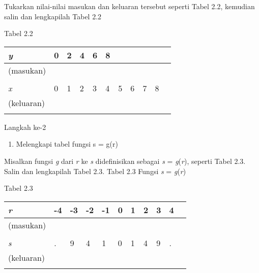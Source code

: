 \documentclass[11pt,fleqn]{book} %
\begin{document}
\begin{myEnumerate}
\begin{itemize}
\noindent Tukarkan nilai-nilai masukan dan keluaran tersebut seperti Tabel 2.2, kemudian salin dan lengkapilah Tabel 2.2 

\noindent \textbf{}

\noindent Tabel 2.2

\noindent 

\begin{tabular}{|p{0.6in}|p{0.4in}|p{0.3in}|p{0.2in}|p{0.2in}|p{0.2in}|p{0.2in}|p{0.2in}|p{0.2in}|p{0.2in}|p{0.2in}|} \hline 
\textit{y}  & 0 & 2 & 4 & 6 & 8 &  &  &  &  \\ \hline 
 (masukan) &  &  &  &  &  &  &  &  &  \\ \hline 
 &  &  &  &  &  &  &  &  &  &  \\ \hline 
\textit{x}  & 0 & 1 & 2 & 3 & 4 & 5 & 6 & 7 & 8 \\ \hline 
 (keluaran) &  &  &  &  &  &  &  &  &  \\ \hline 
 &  &  &  &  &  &  &  &  &  &  \\ \hline 
\end{tabular}



\noindent 

\noindent 

\noindent Langkah ke-2

\noindent 

\noindent 

\begin{enumerate}
\item  Melengkapi tabel fungsi s = g(r)
\end{enumerate}

\noindent Misalkan fungsi \textit{g} dari \textit{r} ke \textit{s} didefinisikan sebagai \textit{s} = \textit{g}(\textit{r}), seperti Tabel 2.3. Salin dan lengkapilah Tabel 2.3. Tabel 2.3\textbf{ }Fungsi\textbf{ }\textit{s}\textbf{ }=\textbf{ }\textit{g}(\textit{r})

\noindent Tabel 2.3

\noindent 

\begin{tabular}{|p{0.6in}|p{0.4in}|p{0.3in}|p{0.2in}|p{0.2in}|p{0.2in}|p{0.2in}|p{0.2in}|p{0.2in}|p{0.2in}|p{0.2in}|} \hline 
\textit{r}  & -4 & -3 & -2 & -1 & 0 & 1 & 2 & 3 & 4 \\ \hline 
 (masukan) &  &  &  &  &  &  &  &  &  \\ \hline 
 &  &  &  &  &  &  &  &  &  &  \\ \hline 
\textit{s}  & . & 9 & 4 & 1 & 0 & 1 & 4 & 9 & . \\ \hline 
 (keluaran) &  &  &  &  &  &  &  &  &  \\ \hline 
 &  &  &  &  &  &  &  &  &  &  \\ \hline 
\end{tabular}




\end{itemize}
\end{myEnumerate}
\end{document}

